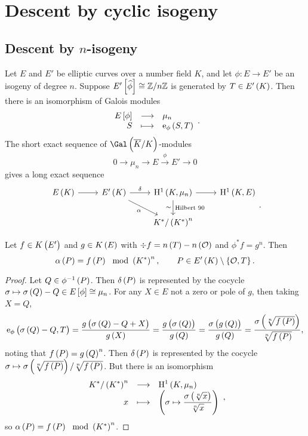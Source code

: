 \pagebreak

\section{Descent by cyclic isogeny}

\subsection{Descent by \texorpdfstring{$ n $}{n}-isogeny}

Let $ E $ and $ E' $ be elliptic curves over a number field $ K $, and let $ \phi : E \to E' $ be an isogeny of degree $ n $. Suppose $ E'\sbr{\widehat{\phi}} \cong \ZZ / n\ZZ $ is generated by $ T \in E'\br{K} $. Then there is an isomorphism of Galois modules
$$ \function{E\sbr{\phi}}{\mu_n}{S}{\e_\phi\br{S, T}}. $$
The short exact sequence of $ \Gal\br{\overline{K} / K} $-modules
$$ 0 \to \mu_n \to E \xrightarrow{\phi} E' \to 0 $$
gives a long exact sequence
$$
\begin{tikzcd}
E\br{K} \arrow{r} & E'\br{K} \arrow{r}{\delta} \arrow{dr}[swap]{\alpha} & \H^1\br{K, \mu_n} \arrow{r} \arrow{d}{\text{Hilbert 90}}[swap]{\sim} & \H^1\br{K, E} \\
& & K^* / \br{K^*}^n &
\end{tikzcd}.
$$

\begin{theorem}
\label{thm:16.1}
Let $ f \in K\br{E'} $ and $ g \in K\br{E} $ with $ \div f = n\br{T} - n\br{\OOO} $ and $ \phi^*f = g^n $. Then
$$ \alpha\br{P} = f\br{P} \mod \br{K^*}^n, \qquad P \in E'\br{K} \setminus \cbr{\OOO, T}. $$
\end{theorem}

\begin{proof}
Let $ Q \in \phi^{-1}\br{P} $. Then $ \delta\br{P} $ is represented by the cocycle $ \sigma \mapsto \sigma\br{Q} - Q \in E\sbr{\phi} \cong \mu_n $. For any $ X \in E $ not a zero or pole of $ g $, then taking $ X = Q $,
$$ \e_\phi\br{\sigma\br{Q} - Q, T} = \dfrac{g\br{\sigma\br{Q} - Q + X}}{g\br{X}} = \dfrac{g\br{\sigma\br{Q}}}{g\br{Q}} = \dfrac{\sigma\br{g\br{Q}}}{g\br{Q}} = \dfrac{\sigma\br{\sqrt[n]{f\br{P}}}}{\sqrt[n]{f\br{P}}}, $$
noting that $ f\br{P} = g\br{Q}^n $. Then $ \delta\br{P} $ is represented by the cocycle $ \sigma \mapsto \sigma\br{\sqrt[n]{f\br{P}}} / \sqrt[n]{f\br{P}} $. But there is an isomorphism
$$ \function{K^* / \br{K^*}^n}{\H^1\br{K, \mu_n}}{x}{\br{\sigma \mapsto \dfrac{\sigma\br{\sqrt[n]{x}}}{\sqrt[n]{x}}}}, $$
so $ \alpha\br{P} = f\br{P} \mod \br{K^*}^n $.
\end{proof}

